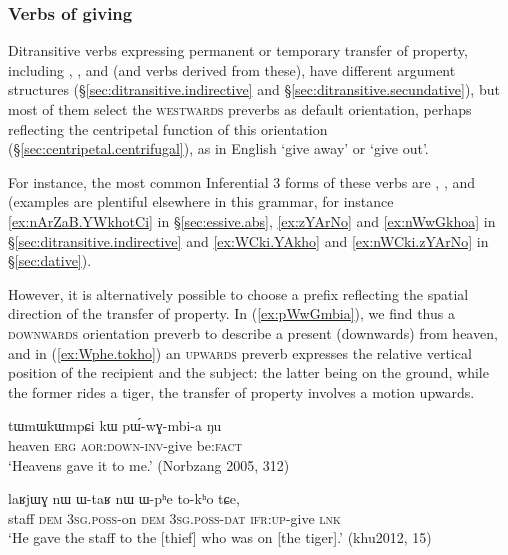 \subsubsection{Verbs of giving} \label{sec:preverb.giving}
Ditransitive verbs expressing permanent or temporary transfer of property, including ,  ,  and  (and verbs derived from these), have different argument structures (§\ref{sec:ditransitive.indirective} and §\ref{sec:ditransitive.secundative}), but most of them select the \textsc{westwards} preverbs as default orientation, perhaps reflecting the centripetal function of this orientation (§\ref{sec:centripetal.centrifugal}), as in English `give away' or `give out'.

For instance, the most common Inferential 3\flobv{} forms of these verbs are , ,  and  (examples are plentiful elsewhere in this grammar, for instance \ref{ex:nArZaB.YWkhotCi} in §\ref{sec:essive.abs}, \ref{ex:zYArNo} and \ref{ex:nWwGkhoa} in §\ref{sec:ditransitive.indirective} and \ref{ex:WCki.YAkho} and \ref{ex:nWCki.zYArNo} in §\ref{sec:dative}). 
 
However, it is alternatively possible to choose a prefix reflecting the spatial direction of the transfer of property. In (\ref{ex:pWwGmbia}), we find thus a \textsc{downwards} orientation preverb to describe a present (downwards) from heaven, and in (\ref{ex:Wphe.tokho}) an \textsc{upwards} preverb expresses the relative vertical position of the recipient and the subject: the latter being on the ground, while the former rides a tiger, the transfer of property involves a motion upwards.
 
\begin{exe}
\ex \label{ex:pWwGmbia}
\gll tɯmɯkɯmpɕi kɯ pɯ́-wɣ-mbi-a ŋu \\
heaven \textsc{erg} \textsc{aor}:\textsc{down}-\textsc{inv}-give be:\textsc{fact} \\
\glt `Heavens gave it to me.' (Norbzang 2005, 312)
\end{exe}

\begin{exe}
\ex \label{ex:Wphe.tokho}
\gll laʁjɯɣ nɯ ɯ-taʁ nɯ ɯ-pʰe to-kʰo tɕe,  \\
staff \textsc{dem} \textsc{3sg}.\textsc{poss}-on \textsc{dem} \textsc{3sg}.\textsc{poss}-\textsc{dat} \textsc{ifr}:\textsc{up}-give \textsc{lnk} \\
\glt `He gave the staff to the [thief] who was on [the tiger].' (khu2012, 15)
\end{exe}

